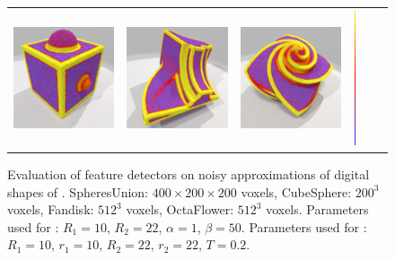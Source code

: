 \begin{figure}[ht]
\begin{center}
\begin{tabular}{l c c c cl}
      \includegraphics[width=4.0cm]{images/Feature/CubeSphere_noise_VCM_r_22} &
      \includegraphics[width=4.0cm]{images/Feature/Fandisk_noise_VCM_r_22} &
      \includegraphics[width=4.0cm]{images/Feature/OctaFlower_512_noise_VCM_r_22} &
      \includegraphics[width=0.1cm,height=4cm]{images/YMTB6W}
    \end{tabular}
    \caption[Evaluation of feature detectors on noisy approximations of digital shapes of ]{Evaluation of feature detectors on noisy approximations of digital shapes of .
    SpheresUnion: $400 \times 200 \times 200$ voxels, CubeSphere: $200^3$ voxels, Fandisk: $512^3$ voxels, OctaFlower: $512^3$ voxels.
    Parameters used for \cite{Telea2004}: $R_1 = 10$, $R_2 = 22$, $\alpha = 1$, $\beta = 50$.
    Parameters used for \cite{Merigot2011}: $R_1 = 10$, $r_1 = 10$, $R_2 = 22$, $r_2 = 22$, $T = 0.2$.\label{fig:feature-comparative-noise}}
  \end{center}
\end{figure}



